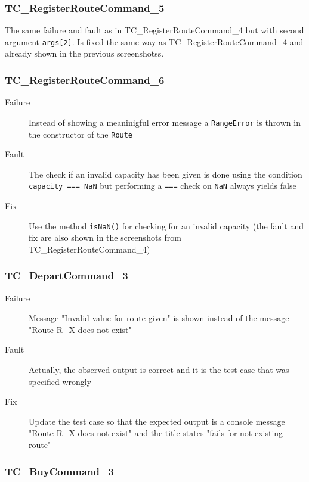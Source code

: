 \documentclass[11pt]{article}
\begin{document}
\subsubsection{TC\_RegisterRouteCommand\_5}
\label{sec:orgc4a5cbf}

The same failure and fault as in TC\_RegisterRouteCommand\_4 but with second argument \texttt{args[2]}. Is fixed the same way as TC\_RegisterRouteCommand\_4 and already shown in the previous screenshotss.

\subsubsection{TC\_RegisterRouteCommand\_6}
\label{sec:org4c22883}

\begin{description}
\item[{Failure}] Instead of showing a meaninigful error message a \texttt{RangeError} is thrown in the constructor of the \texttt{Route}
\item[{Fault}] The check if an invalid capacity has been given is done using the condition \texttt{capacity === NaN} but performing a \texttt{===} check on \texttt{NaN} always yields false
\item[{Fix}] Use the method \texttt{isNaN()} for checking for an invalid capacity (the fault and fix are also shown in the screenshots from TC\_RegisterRouteCommand\_4)
\end{description}

\subsubsection{TC\_DepartCommand\_3}
\label{sec:org3fd9eaf}

\begin{description}
\item[{Failure}] Message "Invalid value for route given" is shown instead of the message "Route R\_X does not exist"
\item[{Fault}] Actually, the observed output is correct and it is the test case that was specified wrongly
\item[{Fix}] Update the test case so that the expected output is a console message "Route R\_X does not exist" and the title states "fails for not existing route"
\end{description}

\subsubsection{TC\_BuyCommand\_3}
\label{sec:org5d59406}
\end{document}
